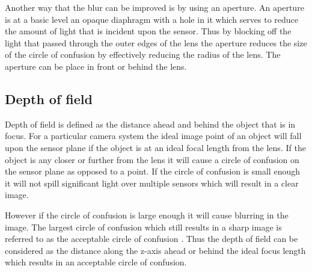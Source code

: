 \documentclass[12pt,oneside,openany,a4paper, %
english, %
masters-t, goldenblock]{usthesis}
\begin{document}
Another way that the blur can be improved is by using an aperture. An aperture is at a basic level an opaque diaphragm with a hole in it which serves to reduce the amount of light that is incident upon the sensor. Thus by blocking off the light that passed through the outer edges of the lens the aperture reduces the size of the circle of confusion by effectively reducing the radius of the lens. The aperture can be place in front or behind the lens. 

\subsection{Depth of field}
Depth of field is defined as the distance ahead and behind the object that is in focus. For a particular camera system the ideal image point of an object will fall upon the sensor plane if the object is at an ideal focal length from the lens. If the object is any closer or further from the lens it will cause a circle of confusion on the sensor plane as opposed to a point. If the circle of confusion is small enough it will not spill significant light over multiple sensors which will result in a clear image.%

However if the circle of confusion is large enough it will cause blurring in the image. The largest circle of confusion which still results in a sharp image is referred to as the acceptable circle of confusion \cite{sutton2009image}. Thus the depth of field can be considered as the distance along the z-axis ahead or behind the ideal focus length which results in an acceptable circle of confusion.
\end{document}
